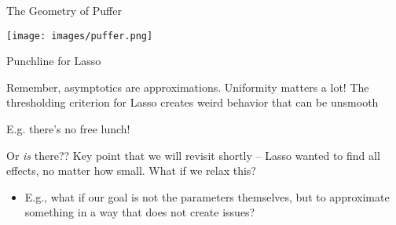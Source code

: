 \documentclass[notes,11pt, aspectratio=169]{beamer}
\newenvironment{wideitemize}{\itemize\addtolength{\itemsep}{10pt}}{\enditemize}
\begin{document}
\begin{frame}{The Geometry of Puffer}
\begin{center}
  \texttt{[image: images/puffer.png]}
\end{center}
\end{frame}

\begin{frame}{Punchline for Lasso}
  \begin{wideitemize}
  \item Remember, asymptotics are approximations. Uniformity matters a
    lot! The thresholding criterion for Lasso creates weird behavior
    that can be unsmooth
  \item E.g. there's no free lunch!
  \item Or \emph{is} there?? Key point that we will revisit shortly --
    Lasso wanted to find all effects, no matter how small. What if we
    relax this?
    \begin{itemize}
    \item E.g., what if our goal is not the parameters themselves, but
      to approximate something in a way that does not create issues?
    \end{itemize}
  \end{wideitemize}
\end{frame}
\end{document}
